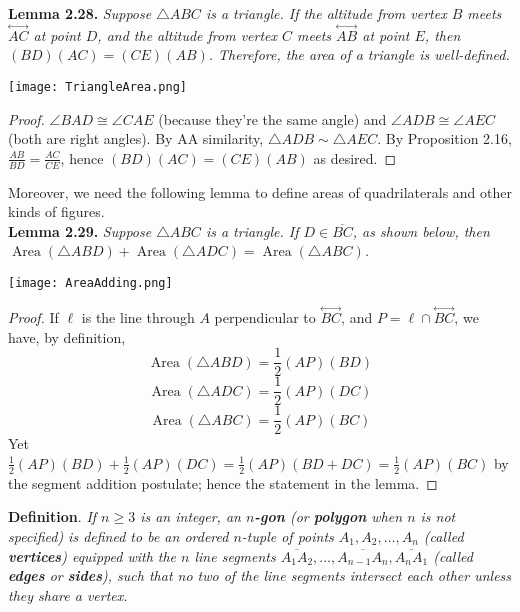 \documentclass[leqno]{book}
\begin{document}
\noindent\textbf{Lemma 2.28.} \emph{Suppose $\triangle ABC$ is a triangle.  If the altitude from vertex $B$ meets $\overset{\longleftrightarrow}{AC}$ at point $D$, and the altitude from vertex $C$ meets $\overset{\longleftrightarrow}{AB}$ at point $E$, then $(BD)(AC)=(CE)(AB)$.  Therefore, the area of a triangle is well-defined.}
\begin{center}\texttt{[image: TriangleArea.png]}\end{center}
\begin{proof}
$\angle BAD\cong\angle CAE$ (because they're the same angle) and $\angle ADB\cong\angle AEC$ (both are right angles).  By AA similarity, $\triangle ADB\sim\triangle AEC$.  By Proposition 2.16, $\frac{AB}{BD}=\frac{AC}{CE}$, hence $(BD)(AC)=(CE)(AB)$ as desired.
\end{proof}

\noindent Moreover, we need the following lemma to define areas of quadrilaterals and other kinds of figures.\\

\noindent\textbf{Lemma 2.29.} \emph{Suppose $\triangle ABC$ is a triangle.  If $D\in\overline{BC}$, as shown below, then $\operatorname{Area}(\triangle ABD)+\operatorname{Area}(\triangle ADC)=\operatorname{Area}(\triangle ABC)$.}
\begin{center}\texttt{[image: AreaAdding.png]}\end{center}
\begin{proof}
If $\ell$ is the line through $A$ perpendicular to $\overset{\longleftrightarrow}{BC}$, and $P=\ell\cap\overset{\longleftrightarrow}{BC}$, we have, by definition,
$$\operatorname{Area}(\triangle ABD)=\frac 12(AP)(BD)$$
$$\operatorname{Area}(\triangle ADC)=\frac 12(AP)(DC)$$
$$\operatorname{Area}(\triangle ABC)=\frac 12(AP)(BC)$$
Yet $\frac 12(AP)(BD)+\frac 12(AP)(DC)=\frac 12(AP)(BD+DC)=\frac 12(AP)(BC)$ by the segment addition postulate; hence the statement in the lemma.
\end{proof}

\noindent\textbf{Definition}. \emph{If $n\geqslant 3$ is an integer, an \textbf{$n$-gon} (or \textbf{polygon} when $n$ is not specified) is defined to be an ordered $n$-tuple of points $A_1,A_2,\dots,A_n$ (called \textbf{vertices}) equipped with the $n$ line segments $\overline{A_1A_2},\dots,\overline{A_{n-1}A_n},\overline{A_nA_1}$ (called \textbf{edges} or \textbf{sides}), such that no two of the line segments intersect each other unless they share a vertex.}\\
\end{document}
